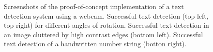 \documentclass[11pt]{article}
\begin{document}
\begin{figure}[ht]
    \centering
    \caption
    {
      Screenshots of the proof-of-concept implementation of a text detection system using
      a webcam. Successful text detection (top left, top right) for different angles of rotation.
      Successful text detection in an image cluttered by high contrast edges (bottom left).
      Successful text detection of a handwritten number string (botton right).
    }
    \label{fig:webcam}
\end{figure}
\end{document}
